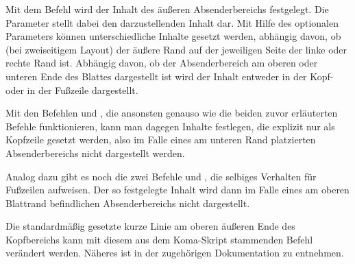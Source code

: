 \begin{Declaration}
  \\
  \\
  \\
  \\
  \\
\end{Declaration}

Mit dem Befehl 
wird der Inhalt des äußeren Absenderbereichs festgelegt.
Die Parameter  stellt dabei den darzustellenden Inhalt dar.
Mit Hilfe des optionalen Parameters  können unterschiedliche
Inhalte gesetzt werden, abhängig davon, ob (bei zweiseitigem Layout)
der äußere Rand auf der jeweiligen Seite der linke oder rechte Rand ist.
Abhängig davon, ob der Absenderbereich am oberen oder unteren Ende des Blattes
dargestellt ist wird der Inhalt entweder in der Kopf- oder in der Fußzeile
dargestellt.

Mit den Befehlen  und , die ansonsten genauso
wie die beiden zuvor erläuterten Befehle funktionieren, kann man dagegen
Inhalte festlegen, die explizit nur als Kopfzeile gesetzt werden, also
im Falle eines am unteren Rand platzierten Absenderbereichs nicht dargestellt 
werden.

Analog dazu gibt es noch die zwei Befehle 
und , die selbiges Verhalten für Fußzeilen aufweisen.
Der so festgelegte Inhalt wird dann im Falle eines am oberen Blattrand
befindlichen Absenderbereichs nicht dargestellt.

\begin{Declaration}
\end{Declaration}

Die standardmäßig gesetzte kurze Linie am oberen äußeren Ende des
Kopfbereichs kann mit diesem aus dem Koma-Skript stammenden Befehl verändert
werden. Näheres ist in der zugehörigen Dokumentation zu
entnehmen\cite{koma-skript}.


